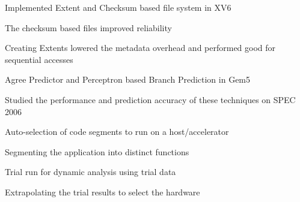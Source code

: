 \documentclass[letterpaper]{deedy-resume}
\begin{document}
\begin{minipage}[t]{0.66\textwidth}
\sectionspace %
\begin{tightitemize}	
\item    Implemented Extent and Checksum based file system in XV6
\item    The checksum based files improved reliability
\item    Creating Extents lowered the metadata overhead and performed good for sequential accesses 
\end{tightitemize}

\sectionspace %
\begin{tightitemize}	
\item  Agree Predictor and Perceptron based Branch Prediction in Gem5
\item  Studied the performance and prediction accuracy of these techniques on SPEC 2006
\end{tightitemize}

\sectionspace %
\begin{tightitemize}
\item{Auto-selection of code segments to run on a host/accelerator}         
\item{Segmenting the application into distinct functions}
\item{Trial run for dynamic analysis using trial data}
\item{Extrapolating the trial results to select the hardware}     
\end{tightitemize}







\end{minipage} %
\end{document}
